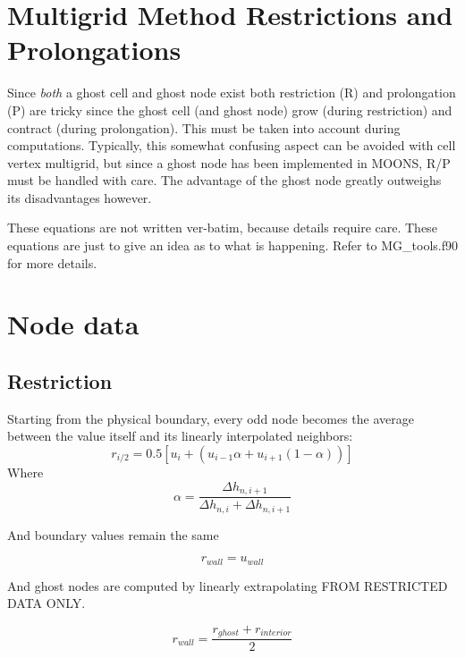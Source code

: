 \documentclass[11pt]{article}
\begin{document}
\doublespacing
\MOONSTITLE
\maketitle

\section{Multigrid Method Restrictions and Prolongations}
Since \textit{both} a ghost cell and ghost node exist both restriction (R) and prolongation (P) are tricky since the ghost cell (and ghost node) grow (during restriction) and contract (during prolongation). This must be taken into account during computations. Typically, this somewhat confusing aspect can be avoided with cell vertex multigrid, but since a ghost node has been implemented in MOONS, R/P must be handled with care. The advantage of the ghost node greatly outweighs its disadvantages however.

These equations are not written ver-batim, because details require care. These equations are just to give an idea as to what is happening. Refer to MG\_tools.f90 for more details.

\section{Node data}

\subsection{Restriction}
Starting from the physical boundary, every odd node becomes the average between the value itself and its linearly interpolated neighbors:
\begin{equation}
	r_{i/2} = 0.5 \left[ u_i + (u_{i-1}\alpha + u_{i+1}(1-\alpha)) \right]
\end{equation}
Where
\begin{equation}
	\alpha = \frac{\Delta h_{n,i+1}}{\Delta h_{n,i} + \Delta h_{n,i+1}}
\end{equation}

And boundary values remain the same

\begin{equation}
	r_{wall} = u_{wall}
\end{equation}

And ghost nodes are computed by linearly extrapolating FROM RESTRICTED DATA ONLY.

\begin{equation}
	r_{wall} = \frac{r_{ghost}+r_{interior}}{2}
\end{equation}
\end{document}
